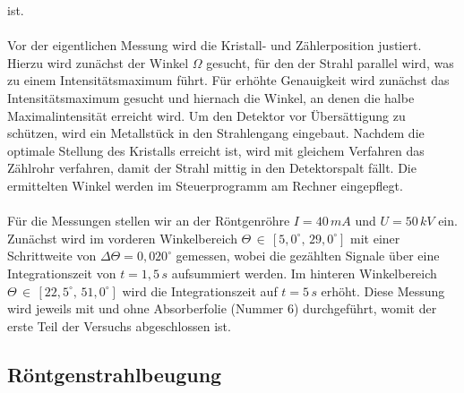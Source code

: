 ist. \\ \\
Vor der eigentlichen Messung wird die Kristall- und Zählerposition justiert. 
Hierzu wird zunächst der Winkel $\Omega$ gesucht, für den der Strahl parallel
wird, was zu einem Intensitätsmaximum führt. Für erhöhte Genauigkeit wird
zunächst das Intensitätsmaximum gesucht und hiernach die Winkel, an denen die halbe 
Maximalintensität erreicht wird. Um den Detektor vor Übersättigung zu schützen, 
wird ein Metallstück in den Strahlengang eingebaut. Nachdem die optimale Stellung 
des Kristalls erreicht ist, wird mit gleichem Verfahren das Zählrohr verfahren, 
damit der Strahl mittig in den Detektorspalt fällt. Die ermittelten Winkel werden
im Steuerprogramm am Rechner eingepflegt. \\ \\
Für die Messungen stellen wir an der Röntgenröhre $I = 40\,\si{mA}$ und 
$U = 50\,\si{kV}$ ein. Zunächst wird im vorderen Winkelbereich 
$\Theta\,\in\,[5,0^{\circ},\,29,0^{\circ}]$ mit einer Schrittweite von 
$\Delta{\Theta} = 0,020^{\circ}$ gemessen, wobei die gezählten Signale 
über eine Integrationszeit von $t=1,5\,\si{s}$ aufsummiert werden. 
Im hinteren Winkelbereich $\Theta\,\in\,[22,5^{\circ},\,51,0^{\circ}]$
wird die Integrationszeit auf $t=5\,\si{s}$ erhöht. 
Diese Messung wird jeweils mit und ohne Absorberfolie (Nummer 6) durchgeführt, 
womit der erste Teil der Versuchs abgeschlossen ist. \\

\subsection{\label{subsec:vers2}Röntgenstrahlbeugung}
